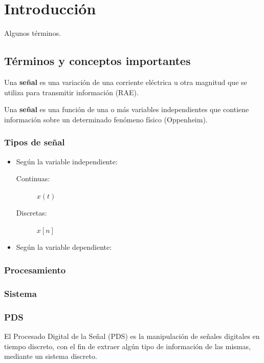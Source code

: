 \documentclass[a4paper]{book}
\begin{document}
\section{Introducción}

Algunos términos.
\subsection{Términos y conceptos importantes}
Una \textbf{señal} es una variación de una corriente eléctrica u otra magnitud que se utiliza para transmitir información (RAE).

Una \textbf{señal} es una función de una o más variables independientes que contiene información sobre un determinado fenómeno físico (Oppenheim).

\subsubsection{Tipos de señal}
\begin{itemize}
	\item Según la variable independiente:
	      \begin{description}
		      \item[Continuas:] $x(t)$
		      \item[Discretas:] $x[n]$
	      \end{description}
	\item Según la variable dependiente:
\end{itemize}

\subsubsection{Procesamiento}

\subsubsection{Sistema}

\subsubsection{PDS}

El Procesado Digital de la Señal (PDS) es la manipulación de señales digitales en tiempo discreto, con el fin de extraer algún tipo de información de las mismas, mediante un sistema discreto.
\end{document}
